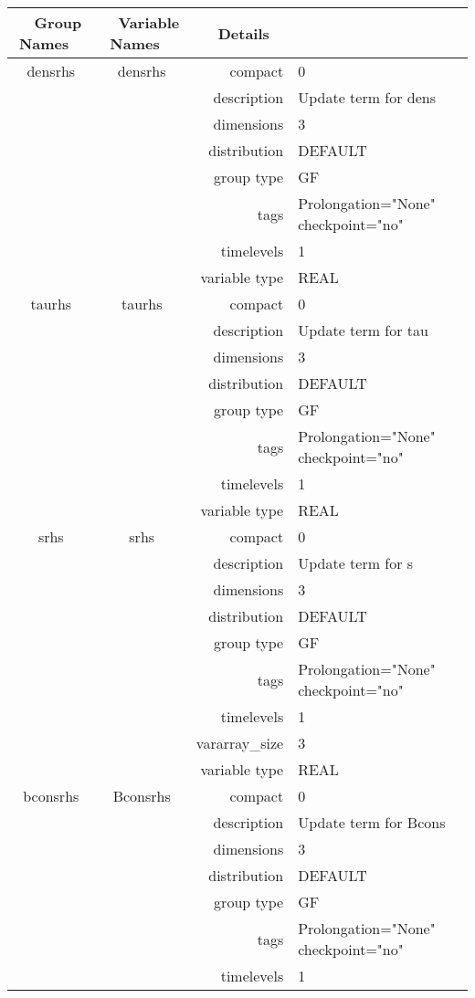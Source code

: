 \begin{tabular*}{150mm}{|c|c@{\extracolsep{\fill}}|rl|} \hline 
~ {\bf Group Names} ~ & ~ {\bf Variable Names} ~  &{\bf Details} ~ & ~ \\ 
\hline 
densrhs & densrhs & compact & 0 \\ 
 &  & description & Update term for dens \\ 
 &  & dimensions & 3 \\ 
 &  & distribution & DEFAULT \\ 
 &  & group type & GF \\ 
 &  & tags & Prolongation="None" checkpoint="no" \\ 
 &  & timelevels & 1 \\ 
 &  & variable type & REAL \\ 
\hline 
taurhs & taurhs & compact & 0 \\ 
 &  & description & Update term for tau \\ 
 &  & dimensions & 3 \\ 
 &  & distribution & DEFAULT \\ 
 &  & group type & GF \\ 
 &  & tags & Prolongation="None" checkpoint="no" \\ 
 &  & timelevels & 1 \\ 
 &  & variable type & REAL \\ 
\hline 
srhs & srhs & compact & 0 \\ 
 &  & description & Update term for s \\ 
 &  & dimensions & 3 \\ 
 &  & distribution & DEFAULT \\ 
 &  & group type & GF \\ 
 &  & tags & Prolongation="None" checkpoint="no" \\ 
 &  & timelevels & 1 \\ 
 &  & vararray\_size & 3 \\ 
 &  & variable type & REAL \\ 
\hline 
bconsrhs & Bconsrhs & compact & 0 \\ 
 &  & description & Update term for Bcons \\ 
 &  & dimensions & 3 \\ 
 &  & distribution & DEFAULT \\ 
 &  & group type & GF \\ 
 &  & tags & Prolongation="None" checkpoint="no" \\ 
 &  & timelevels & 1 \\ 

\end{tabular*}
